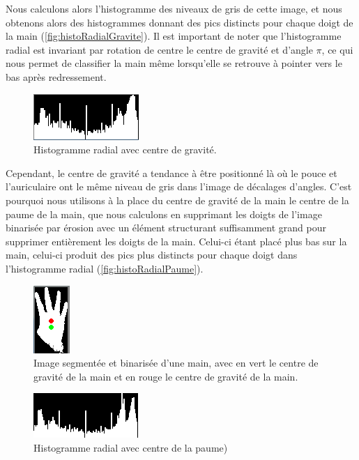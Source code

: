 Nous calculons alors l'histogramme des niveaux de gris de cette image, et nous obtenons alors des histogrammes donnant des pics distincts pour chaque doigt de la main (\autoref{fig:histoRadialGravite}). Il est important de noter que l'histogramme radial est invariant par rotation de centre le centre de gravité et d'angle $\pi$, ce qui nous permet de classifier la main même lorsqu'elle se retrouve à pointer vers le bas après redressement.

\begin{figure}[htb!]
\centerline{\includegraphics{handMassRadialHist.png}}
\caption{Histogramme radial avec centre de gravité.}
\label{fig:histoRadialGravite}
\end{figure}

Cependant, le centre de gravité a tendance à être positionné là où le pouce et l'auriculaire ont le même niveau de gris dans l'image de décalages d'angles. C'est pourquoi nous utilisons à la place du centre de gravité de la main le centre de la paume de la main, que nous calculons en supprimant les doigts de l'image binarisée par érosion avec un élément structurant suffisamment grand pour supprimer entièrement les doigts de la main. Celui-ci étant placé plus bas sur la main, celui-ci produit des pics plus distincts pour chaque doigt dans l'histogramme radial (\autoref{fig:histoRadialPaume}).

\begin{figure}[htb!]
\centerline{\includegraphics{handCenters.png}}
\caption{Image segmentée et binarisée d'une main, avec en vert le centre de gravité de la main et en rouge le centre de gravité de la main.}
\label{fig:segBinRadialCentres}
\end{figure}

\begin{figure}[htb!]
\centerline{\includegraphics{handPalmRadialHist.png}}
\caption{Histogramme radial avec centre de la paume)}
\label{fig:histoRadialPaume}
\end{figure}

